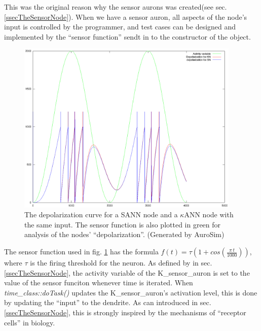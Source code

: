 This was the original reason why the sensor aurons was created(see sec. \ref{ssecTheSensorNode}).
When we have a sensor auron, all aspects of the node's input is controlled by the programmer, and test cases can be designed and implemented by the ``sensor function'' sendt in to the constructor of the object.


\begin{figure}[hbtp!]
	\centering
		\includegraphics[width=0.95\textwidth]{eps_Comparison_between_the_two_sensors__depol.eps}
	\caption{The depolarization curve for a SANN node and a $\kappa$ANN node with the same input. The sensor function is also plotted in green for analysis of the nodes' ``depolarization''. %
	(Generated by AuroSim)}
	\label{figComparisonBetweenSsensorAndKsensorDepolCurve}
\end{figure}

The sensor function used in fig. \ref{figComparisonBetweenSsensorAndKsensorDepolCurve} has the formula \mbox{$f(t) = \tau (1 + cos( \frac{\pi \, t}{1000} ))$}, where $\tau$ is the firing threshold for the neuron. 
As defined by in sec. \ref{ssecTheSensorNode}, the activity variable of the K\_sensor\_auron is set to the value of the sensor funciton whenever time is iterated. %
When \emph{time\_class::doTask()} updates the K\_sensor\_auron's activation level, this is done by updating the ``input'' to the dendrite.
As can introduced in sec. \ref{ssecTheSensorNode}, this is strongly inspired by the mechanisms of ``receptor cells'' in biology. %







